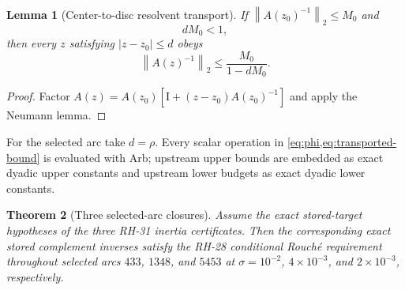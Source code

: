 \documentclass[11pt]{article}
\newtheorem{theorem}{Theorem}[section]
\newtheorem{lemma}[theorem]{Lemma}
\theoremstyle{definition}
\theoremstyle{remark}
\newcommand{\Id}{\mathrm I}
\newcommand{\norm}[1]{\left\lVert#1\right\rVert}
\begin{document}
\begin{lemma}[Center-to-disc resolvent transport]
\label{lem:disc-transport}
If $\norm{A(z_0)^{-1}}_2\leq M_0$ and
\begin{equation}
 dM_0<1,
 \label{eq:neumann-premise}
\end{equation}
then every $z$ satisfying $|z-z_0|\leq d$ obeys
\begin{equation}
 \norm{A(z)^{-1}}_2\leq\frac{M_0}{1-dM_0}.
 \label{eq:transported-bound}
\end{equation}
\end{lemma}

\begin{proof}
Factor
$A(z)=A(z_0)[\Id+(z-z_0)A(z_0)^{-1}]$ and apply the Neumann lemma.
\end{proof}

For the selected arc take $d=\rho$.  Every scalar operation in
\cref{eq:phi,eq:transported-bound} is evaluated with Arb; upstream upper
bounds are embedded as exact dyadic upper constants and upstream lower
budgets as exact dyadic lower constants.

\begin{table}[H]
\centering
\caption{Rigorous RH-31 $\to$ RH-29 $\to$ RH-28 selected-arc composition.
$\delta^-$ is the lower Sherman--Morrison denominator and $\mu^+=\rho
\Phi(K)$ is the upper Neumann product.  The margin is $L^-/M_{\rm arc}^+$.}
\label{tab:composition}
\scriptsize
{}
\end{table}

\begin{theorem}[Three selected-arc closures]
\label{thm:selected-arcs}
Assume the exact stored-target hypotheses of the three RH-31 inertia
certificates.  Then the corresponding exact stored complement inverses
satisfy the RH-28 conditional Rouch\'e requirement throughout selected arcs
$433$, $1348$, and $5453$ at
$\sigma=10^{-2}$, $4\times10^{-3}$, and $2\times10^{-3}$, respectively.
\end{theorem}
\end{document}

